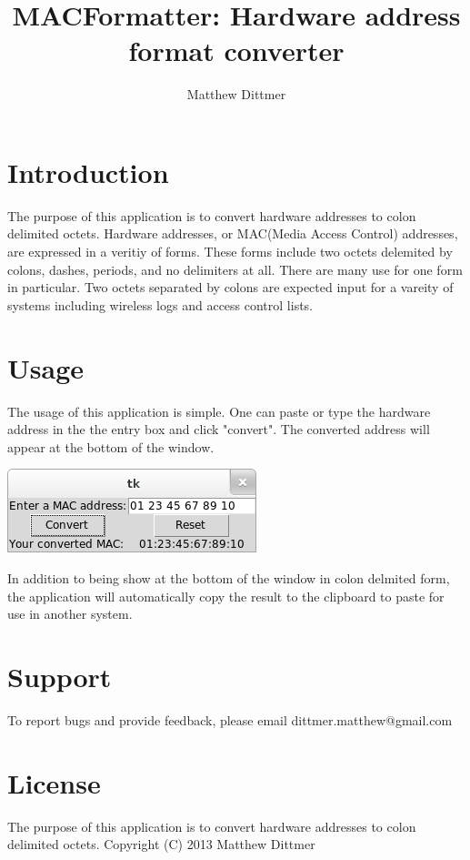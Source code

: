\documentclass[10pt,a4paper]{report}
\author{Matthew Dittmer}
\title{MACFormatter: Hardware address format converter}
\begin{document}
\maketitle
\chapter*{Introduction}

The purpose of this application is to convert hardware addresses to colon delimited octets.  Hardware addresses, or MAC(Media Access Control) addresses, are expressed in a veritiy of forms.  These forms include two octets delemited by colons, dashes, periods, and no delimiters at all.  There are many use for one form in particular.  Two octets separated by colons are expected input for a vareity of systems including wireless logs and access control lists.

\chapter*{Usage}

The usage of this application is simple.  One can paste or type the hardware address in the the entry box and click "convert".  The converted address will appear at the bottom of the window.

\includegraphics[scale=.5]{screenshot0.png}

In addition to being show at the bottom of the window in colon delmited form, the application will automatically copy the result to the clipboard to paste for use in another system.

\chapter*{Support}

To report bugs and provide feedback, please email dittmer.matthew@gmail.com

\chapter*{License}

The purpose of this application is to convert hardware addresses to colon delimited octets.
Copyright (C) 2013  Matthew Dittmer
\end{document}
